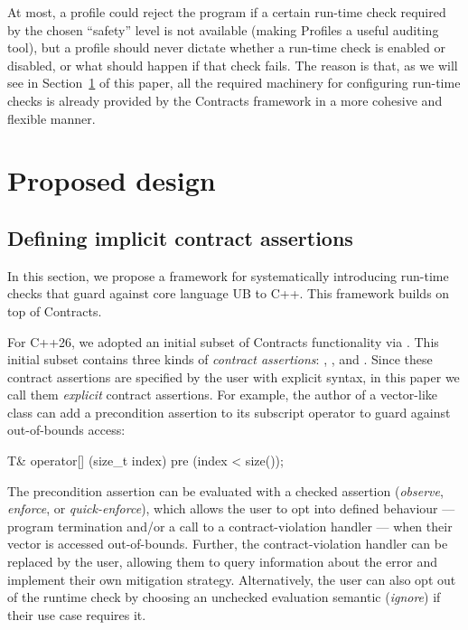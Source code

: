 At most, a profile could reject the program if a certain run-time check required by the chosen ``safety'' level is not available (making Profiles a useful auditing tool), but a profile should never dictate whether a run-time check is enabled or disabled, or what should happen if that check fails. The reason is that, as we will see in Section~\ref{design} of this paper, all the required machinery for configuring run-time checks is already provided by the Contracts framework in a more cohesive and flexible manner.

\section{Proposed design}
\label{design}

\subsection{Defining implicit contract assertions}
\label{defineicas}

In this section, we propose a framework for systematically introducing run-time checks that guard against core language UB to C++. This framework builds on top of Contracts.

For C++26, we adopted an initial subset of Contracts functionality via \cite{P2900R14}. This initial subset contains three kinds of \emph{contract assertions}: , , and . Since these contract assertions are specified by the user with explicit syntax, in this paper we call them \emph{explicit} contract assertions. For example, the author of a vector-like class can add a precondition assertion to its subscript operator to guard against out-of-bounds access:

\begin{codeblock}
T& operator[] (size_t index)
  pre (index < size());
\end{codeblock}

The precondition assertion  can be evaluated with a checked assertion  (\emph{observe}, \emph{enforce}, or \emph{quick-enforce}), which allows the user to opt into defined behaviour --- program termination and/or a call to a contract-violation handler --- when their vector is accessed out-of-bounds. Further, the contract-violation handler can be replaced by the user, allowing them to query information about the error and implement their own mitigation strategy. Alternatively, the user can also opt out of the runtime check by choosing an unchecked evaluation semantic (\emph{ignore}) if their use case requires it. 

